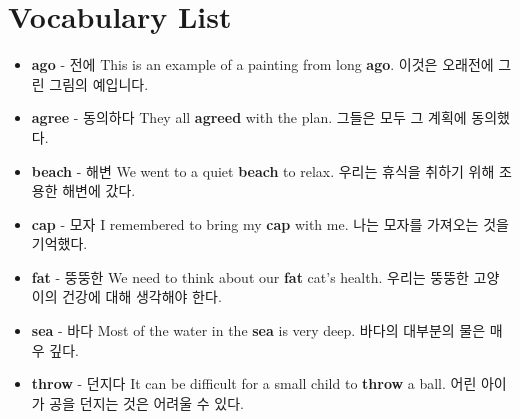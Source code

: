 \documentclass{article}
\begin{document}
\renewcommand{\familydefault}{\sfdefault}
\onehalfspacing

\section*{Vocabulary List}
\begin{addmargin}[1em]{1em}
    \begin{itemize}
        \item \fontsize{12pt}{14pt}\selectfont \textbf{ago} - 전에 \newline
        This is an example of a painting from long \textbf{ago}. \newline
        이것은 오래전에 그린 그림의 예입니다.
        
        \item \fontsize{12pt}{14pt}\selectfont \textbf{agree} - 동의하다 \newline
        They all \textbf{agreed} with the plan. \newline
        그들은 모두 그 계획에 동의했다.
        
        \item \fontsize{12pt}{14pt}\selectfont \textbf{beach} - 해변 \newline
        We went to a quiet \textbf{beach} to relax. \newline
        우리는 휴식을 취하기 위해 조용한 해변에 갔다.
        
        \item \fontsize{12pt}{14pt}\selectfont \textbf{cap} - 모자 \newline
        I remembered to bring my \textbf{cap} with me. \newline
        나는 모자를 가져오는 것을 기억했다.
        
        \item \fontsize{12pt}{14pt}\selectfont \textbf{fat} - 뚱뚱한 \newline
        We need to think about our \textbf{fat} cat's health. \newline
        우리는 뚱뚱한 고양이의 건강에 대해 생각해야 한다.
        
        \item \fontsize{12pt}{14pt}\selectfont \textbf{sea} - 바다 \newline
        Most of the water in the \textbf{sea} is very deep. \newline
        바다의 대부분의 물은 매우 깊다.
        
        \item \fontsize{12pt}{14pt}\selectfont \textbf{throw} - 던지다 \newline
        It can be difficult for a small child to \textbf{throw} a ball. \newline
        어린 아이가 공을 던지는 것은 어려울 수 있다.
        

\end{itemize}
\end{addmargin}
\end{document}
